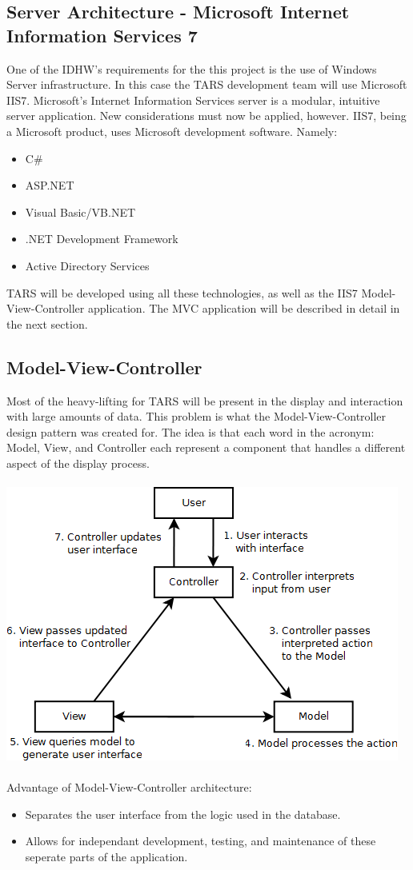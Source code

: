 \documentclass[letterpaper]{article}
\begin{document}
\subsection{Server Architecture - Microsoft Internet Information Services 7} 
One of the IDHW's requirements for the this project is the use of Windows Server infrastructure. In this case the TARS development team will use Microsoft IIS7. Microsoft's Internet Information Services server is a modular, intuitive server application. New considerations must now be applied, however. IIS7, being a Microsoft product, uses Microsoft development software. Namely:
\begin{itemize}
\item C\# 
\item ASP.NET
\item Visual Basic/VB.NET
\item .NET Development Framework
\item Active Directory Services
\end{itemize} 
TARS will be developed using all these technologies, as well as the IIS7 Model-View-Controller application. The MVC application will be described in detail in the next section. 

\subsection{Model-View-Controller}
Most of the heavy-lifting for TARS will be present in the display and interaction with large amounts of data. This problem is what the Model-View-Controller design pattern was created for. The idea is that each word in the acronym: Model, View, and Controller each represent a component that handles a different aspect of the display process.\\
\\

\includegraphics[scale=0.6]{../design/images/mvc.png}\\
\\
Advantage of Model-View-Controller architecture:
\begin{itemize}
\item Separates the user interface from the logic used in the database.
\item Allows for independant development, testing, and maintenance of these seperate parts of the application.
\end{itemize}
\end{document}

